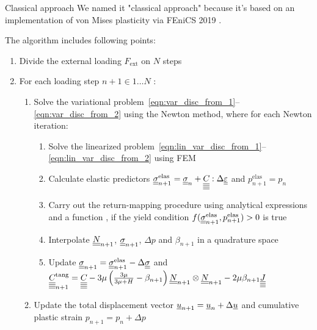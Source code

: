 \documentclass[9pt]{beamer}
\begin{document}
\begin{frame}{Classical approach}
  We named it "classical approach" because it's based on an implementation of von Mises plasticity via FEniCS 2019 .
  \newline 

  The algorithm includes following points:
  \begin{enumerate}
    \item Divide the external loading $F_\text{ext}$ on $N$ steps 
    \item For each loading step $n+1 \in {1 \dots N}$ :
    \begin{enumerate}
        \item Solve the variational problem~\eqref{eqn:var_disc_from_1}--\eqref{eqn:var_disc_from_2} using the Newton method, where for each Newton iteration:
        \begin{enumerate}
            \item Solve the linearized problem~\eqref{eqn:lin_var_disc_from_1}--\eqref{eqn:lin_var_disc_from_2} using FEM
            \item Calculate elastic predictors $\underline{\underline{\sigma}}_{n+1}^{\text{elas}} = \underline{\underline{\sigma}}_n + \underline{\underline{\underline{\underline{C_{}}}}} : \Delta\underline{\underline{\varepsilon}}$ and $p^\text{elas}_{n+1} = p_n$
            \item Carry out the return-mapping procedure using analytical expressions and a function , if the yield condition $f(\underline{\underline{\sigma}}_{n+1}^\text{elas}, p^\text{elas}_{n+1}) > 0$ is true
            \item Interpolate $\underline{\underline{N}}_{n+1}$, $\underline{\underline{\sigma}}_{n+1}$, $\Delta p$ and $\beta_{n+1}$ in a quadrature space
            \item Update $\underline{\underline{\sigma}}_{n+1} = \underline{\underline{\sigma}}_{n+1}^{\text{elas}} - \Delta\underline{\underline{\sigma}}$ and $\underline{\underline{\underline{\underline{C_{}}}}}^\text{tang}_{n+1} = \underline{\underline{\underline{\underline{C_{}}}}} - 3\mu \left( \frac{3\mu}{3\mu + H} - \beta_{n+1} \right) \underline{\underline{N}}_{n+1} \otimes \underline{\underline{N}}_{n+1} - 2\mu\beta_{n+1}\underline{\underline{\underline{\underline{J}}}}$
        \end{enumerate}
        \item Update the total displacement vector $\underline{u}_{n+1} = \underline{u}_n + \Delta\underline{u}$ and cumulative plastic strain $p_{n+1} = p_n + \Delta p$
    \end{enumerate}
  \end{enumerate}
\end{frame}
\end{document}
